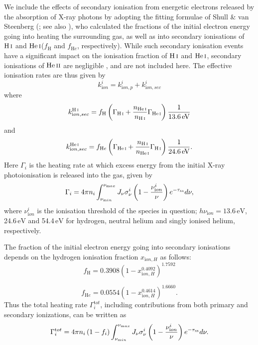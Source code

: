 \documentclass{thesis}
\newcommand{\ev}{\ensuremath{\,\mathrm{eV}}\xspace}
\newcommand{\HI}{\ensuremath{\mathrm{H\,\textsc{i}}}\xspace}
\newcommand{\HeI}{\ensuremath{\mathrm{He\,\textsc{i}}}\xspace}
\newcommand{\HeII}{\ensuremath{\mathrm{He\,\textsc{ii}}}\xspace}
\begin{document}
We include the effects of secondary ionisation from energetic electrons released by the absorption of X-ray photons by adopting the fitting formulae of Shull \& van Steenberg (\citeyear{ShullvanSteenberg1985}; see also \citealt{ValdesFerrara2008, FurlanettoStoever2010}), who calculated the fractions of the initial electron energy going into heating the surrounding gas, as well as into secondary ionisations of \HI and \HeI ($f_{\mathrm H}$ and $f_{\mathrm He}$, respectively). While such secondary ionisation events have a significant impact on the ionisation fraction of \HI and \HeI, secondary ionisations of \HeII are negligible \citep{ShullvanSteenberg1985}, and are not included here.  The effective ionisation rates are thus given by
\begin{equation}
k^i_{\mathrm ion} = k^i_{\mathrm ion, p} + k^i_{\mathrm ion, sec}
\end{equation}
where
\begin{equation}
k^{\mathrm \HI}_{\mathrm ion, sec} = f_{\mathrm H} \left( \Gamma_{\mathrm \HI} + \frac{n_{\mathrm \HeI}}{ n_{\mathrm \HI}} \Gamma_{\mathrm \HeI} \right) \frac{1}{13.6\ev}
\end{equation}
and
\begin{equation}
k^{\mathrm \HeI}_{\mathrm ion, sec} = f_{\mathrm He} \left( \Gamma_{\mathrm \HeI} + \frac{n_{\mathrm \HI}}{ n_{\mathrm \HeI}} \Gamma_{\mathrm \HI} \right) \frac{1}{24.6\ev}.
\end{equation}
Here $\Gamma_i$ is the heating rate at which excess energy from the initial X-ray photoionisation is released into the gas, given by
\begin{equation}
\Gamma_i = 4\pi n_i \int_{\nu_{\mathrm min}}^{\nu_{\mathrm max}} J_{\nu} \sigma^i_{\nu}
\left(1 - \frac{\nu^i_{\mathrm ion}}{\nu} \right) e^{-\tau_{\textsc{xr}}} d\nu,
\end{equation} 
where $\nu^i_{\mathrm ion}$ is the ionisation threshold of the species in question; $h\nu_{\mathrm ion} = 13.6\ev$, 24.6\ev and 54.4\ev for hydrogen, neutral helium and singly ionised helium, respectively.

The fraction of the initial electron energy going into secondary ionisations depends on the hydrogen ionisation fraction $x_{\mathrm ion, H}$ as follows:
\begin{equation}
f_{\mathrm H} = 0.3908 \left( 1 - x_{\mathrm ion, H}^{0.4092} \right) ^{1.7592}
\end{equation}

\begin{equation}
f_{\mathrm He} = 0.0554 \left( 1 - x_{\mathrm ion, H}^{0.4614} \right) ^{1.6660}.
\end{equation}
Thus the total heating rate $\Gamma_i^{\mathrm tot}$, including contributions from both primary and secondary ionizations, can be written as
\begin{equation}
\Gamma_i^{\mathrm tot} = 4\pi n_i \left(1 - f_i \right)
\int_{\nu_{\mathrm min}}^{\nu_{\mathrm max}} J_{\nu} \sigma^i_{\nu}
\left(1 - \frac{\nu^i_{\mathrm ion}}{\nu} \right) e^{-\tau_{\textsc{xr}}} d\nu.
\end{equation}
\end{document}
